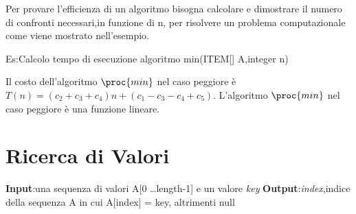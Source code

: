 Per provare l'efficienza di un algoritmo bisogna calcolare e dimostrare il numero di confronti
necessari,in funzione di n, per risolvere un problema computazionale come viene mostrato
nell'esempio.

Es:Calcolo tempo di esecuzione algoritmo min(ITEM[] A,integer n)


Il costo dell'algoritmo $\proc{min}$ nel caso peggiore è $T(n) = (c_2 + c_3 + c_4)n + (c_1 - c_3 - c_4 + c_5)$. \newline
L'algoritmo $\proc{min}$ nel caso peggiore è una funzione lineare.

\section{Ricerca di Valori}
\textbf{Input}:una sequenza di valori A[0 \dots length-1] e un valore \textit{key} \newline
\textbf{Output}:\textit{index},indice della sequenza A in cui A[index] = key, altrimenti null



